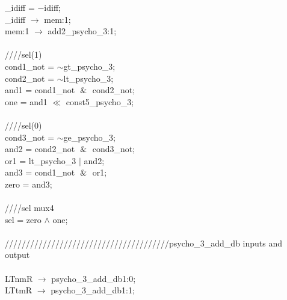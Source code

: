    \hspace*{2em}\_idiff = $-$idiff; \\
   \hspace*{2em}\_idiff $\rightarrow$ mem:1; \\
   \hspace*{2em}mem:1 $\rightarrow$ add2\_psycho\_3:1; \\
   \\
   \hspace*{2em}////sel(1) \\
   \hspace*{2em}cond1\_not = $\sim$gt\_psycho\_3; \\
   \hspace*{2em}cond2\_not = $\sim$lt\_psycho\_3; \\
   \hspace*{2em}and1 = cond1\_not $\And$ cond2\_not; \\
   \hspace*{2em}one = and1 $\ll$ const5\_psycho\_3; \\
   \\
   \hspace*{2em}////sel(0) \\
   \hspace*{2em}cond3\_not = $\sim$ge\_psycho\_3; \\
   \hspace*{2em}and2 = cond2\_not $\And$ cond3\_not; \\
   \hspace*{2em}or1 = lt\_psycho\_3 $\vert$ and2; \\
   \hspace*{2em}and3 = cond1\_not $\And$ or1; \\
   \hspace*{2em}zero = and3; \\
   \\
   \hspace*{2em}////sel mux4 \\
   \hspace*{2em}sel = zero $\wedge$ one; \\
   \\
   \hspace*{2em}///////////////////////////////////////psycho\_3\_add\_db inputs and output \\
   \\
   \hspace*{2em}LTnmR $\rightarrow$ psycho\_3\_add\_db1:0; \\
   \hspace*{2em}LTtmR $\rightarrow$ psycho\_3\_add\_db1:1; \\
